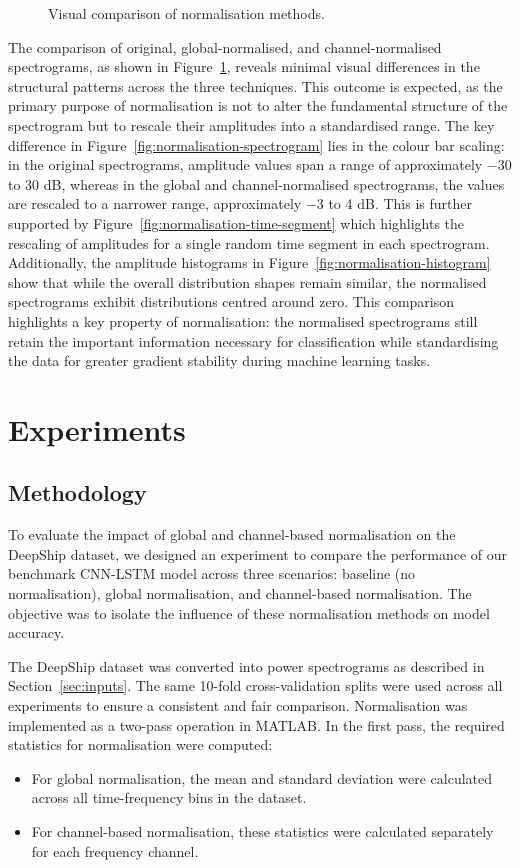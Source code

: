\begin{figure}[htbp]
    \caption{Visual comparison of normalisation methods.}
    \label{fig:normalisation-combined}
\end{figure}

The comparison of original, global-normalised, and channel-normalised spectrograms, as shown in Figure~\ref{fig:normalisation-combined}, reveals minimal visual differences in the structural patterns across the three techniques. This outcome is expected, as the primary purpose of normalisation is not to alter the fundamental structure of the spectrogram but to rescale their amplitudes into a standardised range. The key difference in Figure~\ref{fig:normalisation-spectrogram} lies in the colour bar scaling: in the original spectrograms, amplitude values span a range of approximately $-30$ to 30 dB, whereas in the global and channel-normalised spectrograms, the values are rescaled to a narrower range, approximately $-3$ to 4 dB. This is further supported by Figure~\ref{fig:normalisation-time-segment} which highlights the rescaling of amplitudes for a single random time segment in each spectrogram. Additionally, the amplitude histograms in Figure~\ref{fig:normalisation-histogram} show that while the overall distribution shapes remain similar, the normalised spectrograms exhibit distributions centred around zero. This comparison highlights a key property of normalisation: the normalised spectrograms still retain the important information necessary for classification while standardising the data for greater gradient stability during machine learning tasks.

\section{Experiments}

\subsection{Methodology}

To evaluate the impact of global and channel-based normalisation on the DeepShip dataset, we designed an experiment to compare the performance of our benchmark CNN-LSTM model across three scenarios: baseline (no normalisation), global normalisation, and channel-based normalisation. The objective was to isolate the influence of these normalisation methods on model accuracy.

The DeepShip dataset was converted into power spectrograms as described in Section~\ref{sec:inputs}. The same 10-fold cross-validation splits were used across all experiments to ensure a consistent and fair comparison. Normalisation was implemented as a two-pass operation in MATLAB. In the first pass, the required statistics for normalisation were computed:
\begin{itemize}
    \item For global normalisation, the mean and standard deviation were calculated across all time-frequency bins in the dataset.
    \item For channel-based normalisation, these statistics were calculated separately for each frequency channel. 
\end{itemize}

